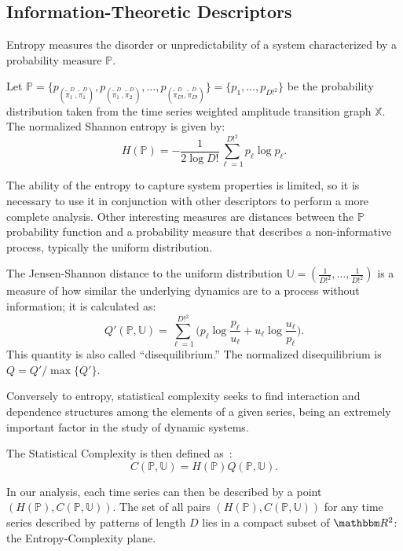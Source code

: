 \documentclass[paper=letter, fontsize=12pt]{article}
\begin{document}
\subsection{Information-Theoretic Descriptors}\label{HC}

Entropy measures the disorder or unpredictability of a system characterized by a probability measure $\mathbb{P}$.

Let $\mathbb{P} = \{p_{(\widetilde\pi^D_1, \widetilde\pi^D_1)}, p_{(\widetilde\pi^D_1, \widetilde\pi^D_2)}, \dots, p_{(\widetilde\pi^D_{D!}, \widetilde\pi^D_{D!})} \} = \{p_1,\dots,p_{D!^2}\}$ be the probability distribution taken from the time series weighted amplitude transition graph $\mathbb{X}$.
The normalized Shannon entropy is given by:	
\begin{equation}
H(\mathbb{P}) = -\frac1{2\log D!}\sum_{\ell=1}^{D!^2} p_{\ell} \log p_{\ell} .
\label{eq:Entropia}
\end{equation}

The ability of the entropy to capture system properties is limited, so it is necessary to use it in conjunction with other des\-criptors to perform a more complete analysis.
Other interesting measures are distances between the $\mathbb{P}$ probability function and a probability measure that describes a non-informative process, typically the uniform distribution.

The Jensen-Shannon distance to the uniform distribution $\mathbb{U} = (\frac{1}{D!^2}, \dots, \frac{1}{D!^2})$ is a measure of how similar the underlying dynamics are to a process without information; it is calculated as:
\begin{equation}
Q'(\mathbb{P}, \mathbb{U}) = \sum_{\ell=1}^{D!^2} \Big(p_\ell \log\frac{p_\ell}{u_\ell} +
u_\ell \log\frac{u_\ell}{p_\ell}
\Big).
\end{equation}
This quantity is also called ``disequilibrium.''
The normalized disequilibrium is $ Q=Q'/\max\{Q'\}$.

Conversely to entropy, statistical complexity seeks to find interaction and dependence structures among the elements of a given series, being an extremely important factor in the study of dynamic systems.

The Statistical Complexity is then defined as~\cite{Lamberti2004}:
\begin{equation}
C(\mathbb{P}, \mathbb{U}) = H(\mathbb{P}) Q(\mathbb{P}, \mathbb{U}).
\end{equation}

In our analysis, each time series can then be described by a point $(H(\mathbb{P}), C(\mathbb{P}, \mathbb{U}))$.
The set of all pairs $(H(\mathbb{P}), C(\mathbb{P}, \mathbb{U}))$ for any time series described by patterns of length $D$ lies in a compact subset of $\mathbbm R^2$: the Entropy-Complexity plane. 
\end{document}
